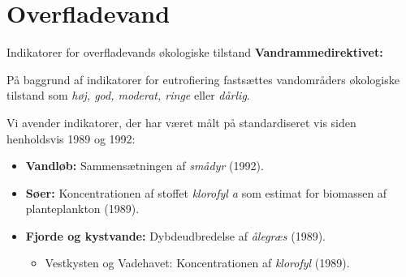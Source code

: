 \section{Overfladevand}

\begin{frame}{Indikatorer for overfladevands økologiske tilstand}
  \textbf{Vandrammedirektivet:}\par
  På baggrund af indikatorer for eutrofiering fastsættes vandområders økologiske tilstand som \textit{høj, god, moderat, ringe} eller \textit{dårlig}.\par
  \vspace{0.5\baselineskip}
  Vi avender indikatorer, der har været målt på standardiseret vis siden henholdsvis 1989 og 1992:
  \begin{itemize}
    \item \textbf{Vandløb:} Sammensætningen af \textit{smådyr} (1992).
    \item \textbf{Søer:} Koncentrationen af stoffet \textit{klorofyl a} som estimat for biomassen af planteplankton (1989).
    \item \textbf{Fjorde og kystvande:} Dybdeudbredelse af \textit{ålegræs} (1989).
    \begin{itemize}
      \item Vestkysten og Vadehavet: Koncentrationen af \textit{klorofyl} (1989).
    \end{itemize}
  \end{itemize}
\end{frame}

